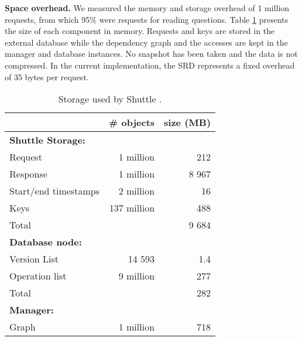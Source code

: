 \documentclass[10pt,conference]{IEEEtran}
\newcommand{\LONG}[1]{}
\begin{document}
\textbf{Space overhead.}
We measured the memory and storage overhead of 1 million requests, from which 95\% were requests for reading questions. Table \ref{tab:storage_overhead} presents the size of each component in memory\LONG{footnote{https://code.google.com/p/memory-measurer}}. Requests and keys are stored in the external database while the dependency graph and the accesses are kept in the manager and database instances. No snapshot has been taken and the data is not compressed.
In the current implementation, the \ac{SRD} represents a fixed overhead of 35 bytes per request.

\begin{table}[h]
\centering
\footnotesize
  \begin{tabular}{l|rr}
                & \# objects & size (MB) \\ \hline
  \textbf{Shuttle Storage: }      \\
  Request         & 1 million    & 212       \\    Response        & 1 million    & 8 967     \\    Start/end timestamps      & 2 million    & 16        \\    Keys            & 137 million  & 488       \\    Total           &              & 9 684     \\    \textbf{Database node:}        &           \\
  Version List    &  14 593      &  1.4       \\   Operation list  &  9 million   &  277       \\   Total           &              & 282 \\   \textbf{Manager:} & & \\ 
  Graph           & 1 million    & 718 \\    \end{tabular}            
\caption{Storage used by Shuttle  \DIFaddbeginFL {}\DIFaddendFL .}
\label{tab:storage_overhead}
\vspace{-5mm}
\end{table}
\end{document}
